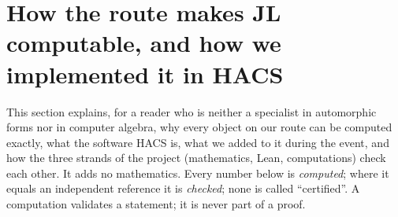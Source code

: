 \section{How the route makes JL computable, and how we implemented it in HACS}\label{ss:s00-computing}
This section explains, for a reader who is neither a specialist in automorphic forms nor in computer algebra, why every
object on our route can be computed exactly, what the software HACS is, what we added to it during the event, and how the
three strands of the project (mathematics, Lean, computations) check each other. It adds no mathematics. Every number below
is \emph{computed}; where it equals an independent reference it is \emph{checked}; none is called ``certified''. A computation
validates a statement; it is never part of a proof.

